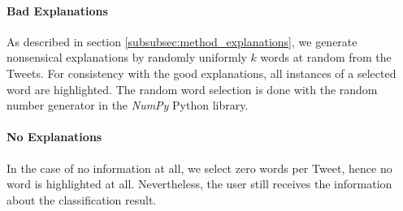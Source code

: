 \paragraph{Bad Explanations}
As described in section \ref{subsubsec:method_explanations}, we generate nonsensical explanations by randomly uniformly $k$ words at random from the Tweets. For consistency with the good explanations, all instances of a selected word are highlighted. The random word selection is done with the random number generator in the \textit{NumPy} Python library.

\paragraph{No Explanations}
In the case of no information at all, we select zero words per Tweet, hence no word is highlighted at all. Nevertheless, the user still receives the information about the classification result.



